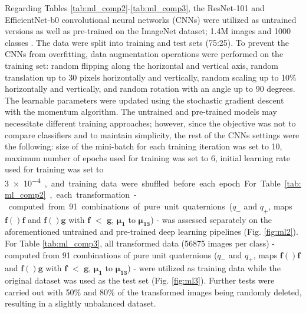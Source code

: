 \documentclass[superscriptaddress,longbibliography,aps,prl,twocolumn,10pt]{revtex4-2}
\begin{document}
Regarding Tables \ref{tab:ml_comp2}-\ref{tab:ml_comp3}, the ResNet-101 \cite{HeZRS15} and EfficientNet-b0 \cite{Tan2019EfficientNetRM} convolutional neural networks (CNNs) were utilized as untrained versions as well as pre-trained on the ImageNet dataset; 1.4M images and 1000 classes \cite{Deng2009}. The data were split into training and test sets (75:25). To prevent the CNNs from overfitting, data augmentation operations were performed on the training set: random flipping along the horizontal and vertical axis, random translation up to 30 pixels horizontally and vertically, random scaling up to 10$\%$ horizontally and vertically, and random rotation with an angle up to 90 degrees. The learnable parameters were updated using the stochastic gradient descent with the momentum algorithm. The untrained and pre-trained models may necessitate different training approaches; however, since the objective was not to compare classifiers and to maintain simplicity, the rest of the CNNs settings were the following: size of the mini-batch for each training iteration was set to 10, maximum number of epochs used for training was set to 6, initial learning rate used for training was set to \SI{3e-4}, and training data were shuffled before each epoch. 

For Table \ref{tab:ml_comp2}, each transformation - computed from 91 combinations of pure unit quaternions ($q_-$ and $q_+$, maps $\boldsymbol{f}()\boldsymbol{f}$ and $\boldsymbol{f}()\boldsymbol{g}$ with $\boldsymbol{f}$ $<$ $\boldsymbol{g}$, $\boldsymbol{\mu_{1}}$ to $\boldsymbol{\mu_{13}}$) - was assessed separately on the aforementioned untrained and pre-trained deep learning pipelines (Fig. \ref{fig:ml2}). For Table \ref{tab:ml_comp3}, all transformed data (56875 images per class) - computed from 91 combinations of pure unit quaternions ($q_-$ and $q_+$, maps $\boldsymbol{f}()\boldsymbol{f}$ and $\boldsymbol{f}()\boldsymbol{g}$ with $\boldsymbol{f}$ $<$ $\boldsymbol{g}$, $\boldsymbol{\mu_{1}}$ to $\boldsymbol{\mu_{13}}$) - were utilized as training data while the original dataset was used as the test set (Fig. \ref{fig:ml3}). Further tests were carried out with 50$\%$ and 80$\%$ of the transformed images being randomly deleted, resulting in a slightly unbalanced dataset.
\end{document}
